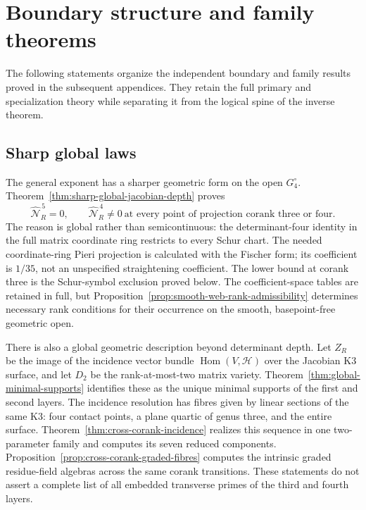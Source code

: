\section{Boundary structure and family theorems}
\label{app:boundary-overview}

The following statements organize the independent boundary and family
results proved in the subsequent appendices.  They retain the full
primary and specialization theory while separating it from the
logical spine of the inverse theorem.

\subsection{Sharp global laws}

The general exponent has a sharper geometric form on the open
\(G_4^\circ\).  Theorem~\ref{thm:sharp-global-jacobian-depth} proves
\[
 \widehat{\mathcal N}_R^{\,5}=0,
 \qquad \widehat{\mathcal N}_R^{\,4}\ne0
 \ \text{at every point of projection corank three or four}.
\]
The reason is global rather than semicontinuous: the determinant-four
identity in the full matrix coordinate ring restricts to every Schur
chart.  The needed coordinate-ring Pieri projection is calculated with
the Fischer form; its coefficient is \(1/35\), not an unspecified
straightening coefficient.  The lower bound at corank three is the
Schur-symbol exclusion proved below.  The coefficient-space tables
are retained in full, but Proposition~\ref{prop:smooth-web-rank-admissibility}
determines necessary rank conditions for their occurrence on the
smooth, basepoint-free geometric open.

There is also a global geometric description beyond determinant depth.
Let \(Z_R\) be the image of the incidence vector bundle
\(\operatorname{Hom}(V,\mathcal H)\) over the Jacobian K3 surface,
and let \(D_2\) be the rank-at-most-two matrix variety.
Theorem~\ref{thm:global-minimal-supports} identifies these as the
unique minimal supports of the first and second layers.  The incidence
resolution has fibres given by linear sections of the same K3:
four contact points, a plane quartic of genus three, and the entire
surface.  Theorem~\ref{thm:cross-corank-incidence} realizes this
sequence in one two-parameter family and computes its seven reduced
components.  Proposition~\ref{prop:cross-corank-graded-fibres}
computes the intrinsic graded residue-field algebras across the same
corank transitions.  These statements do not assert a complete list
of all embedded transverse primes of the third and fourth layers.

